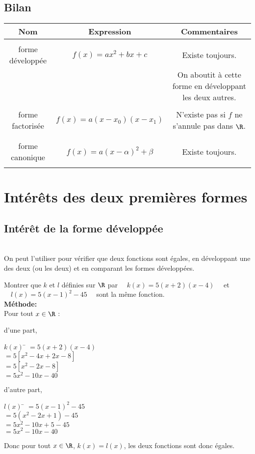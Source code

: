 \documentclass[a4paper,11pt,cours]{nsi}
\begin{document}
\subsection{Bilan}
\begin{center}\footnotesize
	\begin{tabular}{|c|c|c|}
		\hline
		\textbf{Nom} & \textbf{Expression} &\textbf{Commentaires} \\
		\hline
		&&\\
		forme développée & $f(x)=ax^2+bx+c$ & Existe toujours.\\
		&&On aboutit à cette forme en développant les deux autres. \\
		\hline
		&&\\
		forme factorisée & $f(x)=a(x-x_0)(x-x_1)$ & N'existe pas si $f$ ne s'annule pas dans $\R$. \\
		&&\\
		\hline
		&&\\
		forme canonique & $f(x)=a(x-\alpha)^2+\beta$ & Existe toujours. \\
		&&\\
		\hline
	\end{tabular}
\end{center}	


\section{Intérêts des deux premières formes}
\subsection{Intérêt de la forme développée}\ \\[-2em]
On peut l'utiliser pour vérifier que deux fonctions sont égales, en développant une des deux (ou les deux) et en comparant les formes 
développées.

\begin{exemple}
	Montrer que $k$ et $l$ définies sur $\R$ par $\quad k(x)=5(x+2)(x-4)\quad$ et $\quad l(x)=5(x-1)^2-45\quad$ sont la même fonction.\\[1em]
	\textbf{Méthode:}\\
	Pour tout $x\in\R$ :
	\begin{multicols}{2}
		d'une part,
		\begin{tabbing}
			$k(x)$	\= 	$=5(x+2)(x-4)$	\\
			\>	$=5[x^2-4x+2x-8]$	\\
			\>	$=5[x^2-2x-8]$\\
			\>	$=5x^2-10x-40$
		\end{tabbing}
		d'autre part,
		\begin{tabbing}
			$l(x)$	\= 	$=5(x-1)^2-45$	\\
			\>	$=5(x^2-2x+1)-45$	\\
			\>	$=5x^2-10x+5-45$\\
			\>	$=5x^2-10x-40$
		\end{tabbing}
	\end{multicols}
	Donc pour tout $x\in\R$, $k(x)=l(x)$, les deux fonctions sont donc égales.
\end{exemple}
\end{document}
